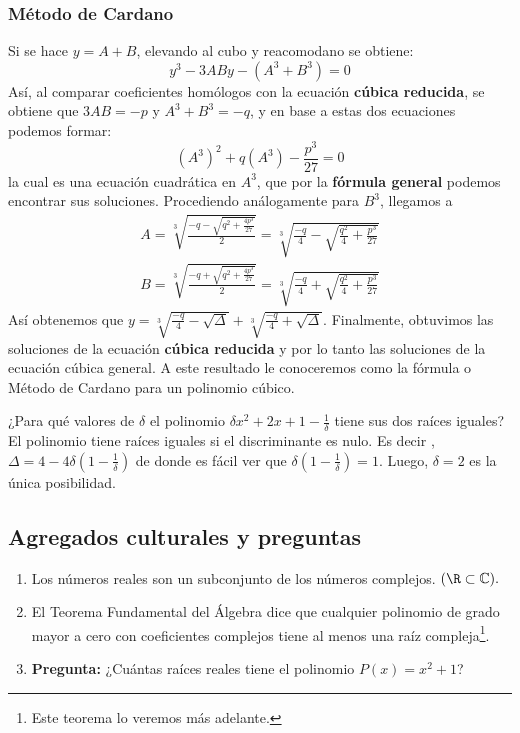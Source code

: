 {    \subsubsection{Método de Cardano}
    {
        Si se hace $y = A + B$, elevando al cubo y reacomodano se obtiene: \[y^3 -3ABy - (A^3 + B^3) = 0\]
        Así, al comparar coeficientes homólogos con la ecuación \textbf{cúbica reducida}, se obtiene que $3AB = - p$ y $A^3 + B^3 = -q$, y en base a estas dos ecuaciones podemos formar:
        \[(A^3)^2 + q(A^3) - \frac{p^3}{27} = 0\] la cual es una ecuación cuadrática en $A^3$, que por la \textbf{fórmula general} podemos encontrar sus soluciones. Procediendo análogamente para $B^3$, llegamos a
        \begin{gather*}
            A = \sqrt[3]{\frac{-q - \sqrt{q^2 + \frac{4p^3}{27}}}{2}} = \sqrt[3]{\frac{-q}{4} - \sqrt{\frac{q^2}{4} + \frac{p^3}{27}}}\\
            B = \sqrt[3]{\frac{-q + \sqrt{q^2 + \frac{4p^3}{27}}}{2}} = \sqrt[3]{\frac{-q}{4} + \sqrt{\frac{q^2}{4} + \frac{p^3}{27}}}
        \end{gather*}
        Así obtenemos que $y = \sqrt[3]{\frac{-q}{4} - \sqrt{\Delta}} + \sqrt[3]{\frac{-q}{4} + \sqrt{\Delta}}$. Finalmente, obtuvimos las soluciones de la ecuación \textbf{cúbica reducida} y por lo tanto las soluciones de la ecuación cúbica general.
        A este resultado le conoceremos como la fórmula o Método de Cardano para un polinomio cúbico.
    }

    \begin{example}
        ¿Para qué valores de $\delta$ el polinomio $\delta x^2 + 2x + 1 - \frac{1}{\delta}$ tiene sus dos raíces iguales?
        \exampleProof
        {
            El polinomio tiene raíces iguales si el discriminante es nulo. Es decir , $\Delta = 4 - 4\delta (1 - \frac{1}{\delta})$ de donde es fácil ver que $\delta (1 - \frac{1}{\delta}) = 1.$ Luego, $\delta = 2$ es la única posibilidad.
        }
    \end{example}
}
\label{subsec:determinar-raices}

\subsection{Agregados culturales y preguntas}
{
    \begin{enumerate}
        \item Los números reales son un subconjunto de los números complejos. $(\R \subset \mathbb{C}).$
        \item El Teorema Fundamental del Álgebra dice que cualquier polinomio de grado mayor a cero con coeficientes complejos tiene al menos una raíz compleja\footnote{Este teorema lo veremos más adelante.}.
        \item \textbf{Pregunta:} ¿Cuántas raíces reales tiene el polinomio $P(x) = x^2+1$?
    \end{enumerate}
}\label{subsec:agregados-culturales}

